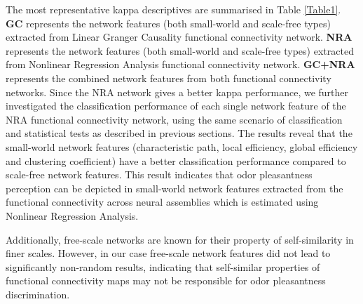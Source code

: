%
%
The most representative kappa descriptives are summarised in Table \ref{Table1}. \textbf{GC} represents the network features (both small-world and scale-free types) extracted from Linear Granger Causality functional connectivity network. \textbf{NRA} represents the network features (both small-world and scale-free types) extracted from Nonlinear Regression Analysis functional connectivity network. \textbf{GC+NRA} represents the combined network features from both functional connectivity networks. Since the NRA network gives a better kappa performance, we further investigated the classification performance of each single network feature of the NRA functional connectivity network, using the same scenario of classification and statistical tests as described in previous sections. The results reveal that the small-world network features (characteristic path, local efficiency, global efficiency and clustering coefficient) have a better classification performance compared to scale-free network features. This result indicates that odor pleasantness perception can be depicted in small-world network features extracted from the functional connectivity across neural assemblies which is estimated using Nonlinear Regression Analysis. 

Additionally, free-scale networks are known for their property of self-similarity in finer scales. However, in our case free-scale network features did not lead to significantly non-random results, indicating that self-similar properties of functional connectivity maps may not be responsible for odor pleasantness discrimination. 

